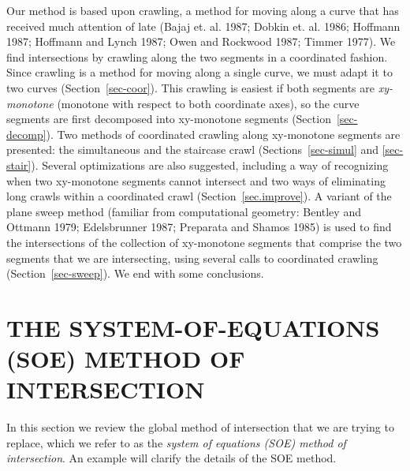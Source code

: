 Our method is based upon crawling, a method for moving along a curve that has 
received much attention of late (Bajaj et. al. 1987; Dobkin et. al. 1986; Hoffmann 1987;
Hoffmann and Lynch 1987; Owen and Rockwood 1987; Timmer 1977).
We find intersections by crawling along the two segments in a coordinated fashion.
Since crawling is a method for moving along a single curve, we must adapt it to two curves
(Section~\ref{sec-coor}).
This crawling is easiest if both segments are {\em xy-monotone} (monotone with 
respect to both coordinate axes), so the curve segments are first decomposed into 
xy-monotone segments (Section~\ref{sec-decomp}).
Two methods of coordinated crawling along xy-monotone segments are presented: 
the simultaneous and the staircase crawl (Sections~\ref{sec-simul} and \ref{sec-stair}).
Several optimizations are also suggested,
including a way of recognizing when two xy-monotone segments cannot intersect 
and two ways of eliminating long crawls within a coordinated crawl (Section~\ref{sec.improve}).
A variant of the plane sweep method (familiar from computational geometry:
Bentley and Ottmann 1979; Edelsbrunner 1987; Preparata and Shamos 1985) is used to find
the intersections of the collection of xy-monotone segments that comprise the two segments
that we are intersecting, using several calls to coordinated crawling (Section~\ref{sec-sweep}).
We end with some conclusions.

\section{THE SYSTEM-OF-EQUATIONS (SOE) METHOD OF INTERSECTION}
\label{sec-soe}

In this section we review the global method of intersection that we are trying to replace, 
which we refer to as the {\em system of equations (SOE) method of intersection}.
An example will clarify the details of the SOE method.


